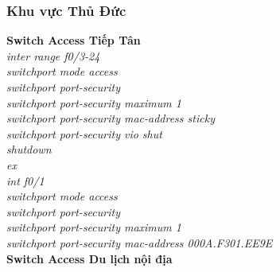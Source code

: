 \documentclass[a4paper, 12pt]{article}
\begin{document}
\subsubsection{Khu vực Thủ Đức}
\hspace*{1cm}\textbf{Switch Access Tiếp Tân}\\
\hspace*{2cm}\textit{inter range f0/3-24\\
\hspace*{2cm}switchport mode access\\
\hspace*{2cm}switchport port-security\\
\hspace*{2cm}switchport port-security maximum 1\\
\hspace*{2cm}switchport port-security mac-address sticky\\
\hspace*{2cm}switchport port-security vio shut\\
\hspace*{2cm}shutdown\\
\hspace*{2cm}ex\\
\hspace*{2cm}int f0/1\\
\hspace*{2cm}switchport mode access\\
\hspace*{2cm}switchport port-security\\
\hspace*{2cm}switchport port-security maximum 1\\
\hspace*{2cm}switchport port-security mac-address 000A.F301.EE9E\\}
\hspace*{1cm}\textbf{Switch Access Du lịch nội địa}\\
\end{document}

